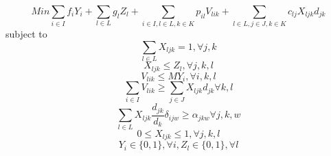 \documentclass[12pt]{article}
\numberwithin{equation}{section}
\begin{document}
\begin{equation}
Min \sum_{i\in I}f_{i}Y_{i} + \sum_{l\in L}g_{l}Z_{l} + \sum_{i\in I,l \in L, k \in K}p_{il}V_{lik} + \sum_{l\in L, j \in J, k \in K}c_{lj}X_{ljk}d_{jk}
\end{equation}
\hspace{2cm} subject to
\begin{equation}
\sum_{l\in L}X_{ljk} = 1,  \forall j,k  
\end{equation}
\begin{equation}
X_{ljk} \leq Z_{l},  \forall j,k,l
\end{equation}
\begin{equation}
V_{lik} \leq MY_{i},  \forall i,k,l
\end{equation}
\begin{equation}
\sum_{i\in I} V_{lik} \geq \sum_{j \in J} X_{ljk}d_{jk}  \forall k,l
\end{equation}
\begin{equation}
\sum_{l\in L} X_{ljk}\frac{d_{jk}}{d_{k}}\delta_{ijw} \geq \alpha_{jkw}  \forall j,k,w
\end{equation}
\begin{equation}
0 \leq X_{ljk} \leq 1,  \forall j,k,l 
\end{equation}
\begin{equation}
\label{Indicator}
Y_{i} \in \{0,1\}, \forall i, 
Z_{l} \in \{0,1\}, \forall l
\end{equation}
\end{document}
